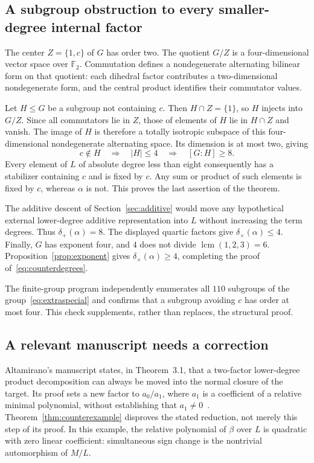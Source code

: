 \documentclass[11pt,letterpaper]{article}
\theoremstyle{definition}\newtheorem{definition}[theorem]{Definition}
\theoremstyle{remark}\newtheorem{remark}[theorem]{Remark}
\newcommand{\lcm}{\operatorname{lcm}}
\newcommand{\ds}{\delta_{+}}
\newcommand{\dm}{\delta_{\times}}
\begin{document}
\subsection{A subgroup obstruction to every smaller-degree internal factor}
The center $Z=\{1,c\}$ of $G$ has order two. The quotient $G/Z$ is a four-dimensional vector space over $\mathbb F_2$. Commutation defines a nondegenerate alternating bilinear form on that quotient: each dihedral factor contributes a two-dimensional nondegenerate form, and the central product identifies their commutator values.

Let $H\le G$ be a subgroup not containing $c$. Then $H\cap Z=\{1\}$, so $H$ injects into $G/Z$. Since all commutators lie in $Z$, those of elements of $H$ lie in $H\cap Z$ and vanish. The image of $H$ is therefore a totally isotropic subspace of this four-dimensional nondegenerate alternating space. Its dimension is at most two, giving
\begin{equation}
 c\notin H\quad\Longrightarrow\quad |H|\le4
 \quad\Longrightarrow\quad [G:H]\ge8.
 \label{eq:centerbound}
\end{equation}
Every element of $L$ of absolute degree less than eight consequently has a stabilizer containing $c$ and is fixed by $c$. Any sum or product of such elements is fixed by $c$, whereas $\alpha$ is not. This proves the last assertion of the theorem.

The additive descent of Section~\ref{sec:additive} would move any hypothetical external lower-degree additive representation into $L$ without increasing the term degrees. Thus $\ds(\alpha)=8$. The displayed quartic factors give $\dm(\alpha)\le4$. Finally, $G$ has exponent four, and $4$ does not divide $\lcm(1,2,3)=6$. Proposition~\ref{prop:exponent} gives $\dm(\alpha)\ge4$, completing the proof of~\eqref{eq:counterdegrees}.

The finite-group program independently enumerates all $110$ subgroups of the group~\eqref{eq:extraspecial} and confirms that a subgroup avoiding $c$ has order at most four. This check supplements, rather than replaces, the structural proof.

\subsection{A relevant manuscript needs a correction}
Altamirano's manuscript states, in Theorem~3.1, that a two-factor lower-degree product decomposition can always be moved into the normal closure of the target. Its proof sets a new factor to $a_0/a_1$, where $a_1$ is a coefficient of a relative minimal polynomial, without establishing that $a_1\ne0$~\cite{altamirano}. Theorem~\ref{thm:counterexample} disproves the stated reduction, not merely this step of its proof. In this example, the relative polynomial of $\beta$ over $L$ is quadratic with zero linear coefficient: simultaneous sign change is the nontrivial automorphism of $M/L$.
\end{document}

